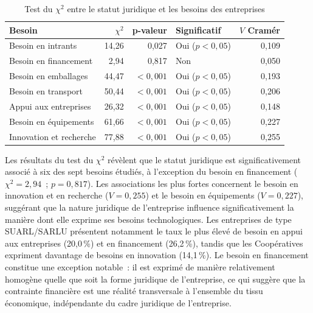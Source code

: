 \documentclass[12pt, a4paper, oneside]{report}
\begin{document}
			\begin{table}[H]
				\centering
				\caption{Test du $\chi^2$ entre le statut juridique et les besoins
					des entreprises}
				\label{tab:khi2_statut}
				\renewcommand{\arraystretch}{1.4}
				\begin{tabularx}{\textwidth}{>{\raggedright\arraybackslash}X
						r r
						>{\centering\arraybackslash}p{2.8cm}
						r}
					\toprule
					\rowcolor{primary!15}
					\textbf{Besoin} & \textbf{$\chi^2$} & \textbf{p-valeur}
					& \textbf{Significatif} & \textbf{$V$ Cramér} \\
					\midrule
					Besoin en intrants        & 14,26 & 0,027  & Oui ($p < 0{,}05$) & 0,109 \\
					\rowcolor{lightgray}
					Besoin en financement     &  2,94 & 0,817  & Non                & 0,050 \\
					Besoin en emballages      & 44,47 & $<0{,}001$ & Oui ($p < 0{,}05$) & 0,193 \\
					\rowcolor{lightgray}
					Besoin en transport       & 50,44 & $<0{,}001$ & Oui ($p < 0{,}05$) & 0,206 \\
					Appui aux entreprises     & 26,32 & $<0{,}001$ & Oui ($p < 0{,}05$) & 0,148 \\
					\rowcolor{lightgray}
					Besoin en équipements     & 61,66 & $<0{,}001$ & Oui ($p < 0{,}05$) & 0,227 \\
					Innovation et recherche   & 77,88 & $<0{,}001$ & Oui ($p < 0{,}05$) & 0,255 \\
					\bottomrule
				\end{tabularx}
			\end{table}
			
			Les résultats du test du $\chi^2$ révèlent que le statut juridique
			est significativement associé à six des sept besoins étudiés, à
			l'exception du besoin en financement ($\chi^2 = 2{,}94$~;
			$p = 0{,}817$). Les associations les plus fortes concernent le besoin
			en innovation et en recherche ($V = 0{,}255$) et le besoin en
			équipements ($V = 0{,}227$), suggérant que la nature juridique de
			l'entreprise influence significativement la manière dont elle exprime
			ses besoins technologiques. Les entreprises de type SUARL/SARLU
			présentent notamment le taux le plus élevé de besoin en appui aux
			entreprises (20,0\,\%) et en financement (26,2\,\%), tandis que les
			Coopératives expriment davantage de besoins en innovation
			(14,1\,\%). Le besoin en financement constitue une exception notable~:
			il est exprimé de manière relativement homogène quelle que soit la
			forme juridique de l'entreprise, ce qui suggère que la contrainte
			financière est une réalité transversale à l'ensemble du tissu
			économique, indépendante du cadre juridique de l'entreprise.
			
\end{document}
